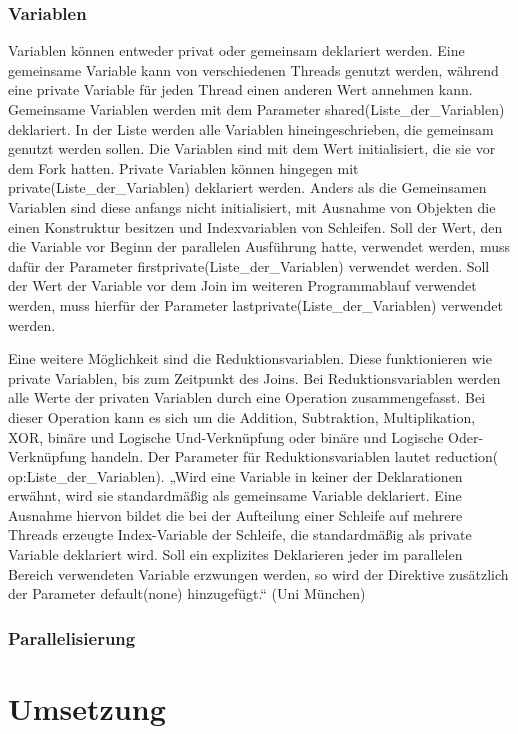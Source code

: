 \documentclass[../main.tex]{subfiles}
\begin{document}
\subsubsection{Variablen}

Variablen können entweder privat oder gemeinsam deklariert werden. Eine gemeinsame Variable kann von verschiedenen Threads genutzt werden, während eine private Variable für jeden Thread einen anderen Wert annehmen kann. Gemeinsame Variablen werden mit dem Parameter shared(Liste\_der\_Variablen) deklariert. In der Liste werden alle Variablen hineingeschrieben, die gemeinsam genutzt werden sollen. Die Variablen sind mit dem Wert initialisiert, die sie vor dem Fork hatten. Private Variablen können hingegen mit private(Liste\_der\_Variablen) deklariert werden.  Anders als die Gemeinsamen Variablen sind diese anfangs nicht initialisiert, mit Ausnahme von Objekten die einen Konstruktur besitzen und Indexvariablen von Schleifen.
Soll der Wert, den die Variable vor Beginn der parallelen Ausführung hatte, verwendet werden, muss dafür der Parameter firstprivate(Liste\_der\_Variablen) verwendet werden. Soll der Wert der Variable vor dem Join im weiteren Programmablauf verwendet werden, muss hierfür der Parameter lastprivate(Liste\_der\_Variablen) verwendet werden.

Eine weitere Möglichkeit sind die Reduktionsvariablen. Diese funktionieren wie private Variablen, bis zum Zeitpunkt des Joins. Bei Reduktionsvariablen werden alle Werte der privaten Variablen durch eine Operation zusammengefasst. Bei dieser Operation kann es sich um die Addition, Subtraktion, Multiplikation, XOR, binäre und Logische Und-Verknüpfung oder binäre und Logische Oder-Verknüpfung handeln. Der Parameter für Reduktionsvariablen lautet reduction( op:Liste\_der\_Variablen).
„Wird eine Variable in keiner der Deklarationen erwähnt, wird sie standardmäßig als gemeinsame Variable deklariert. Eine Ausnahme hiervon bildet die bei der Aufteilung einer Schleife auf mehrere Threads erzeugte Index-Variable der Schleife, die standardmäßig als private Variable deklariert wird. Soll ein explizites Deklarieren jeder im parallelen Bereich verwendeten Variable erzwungen werden, so wird der Direktive zusätzlich der Parameter default(none) hinzugefügt.“ (Uni München)

\subsubsection{Parallelisierung}
\lipsum[1-2]

\section{Umsetzung}
\end{document}
